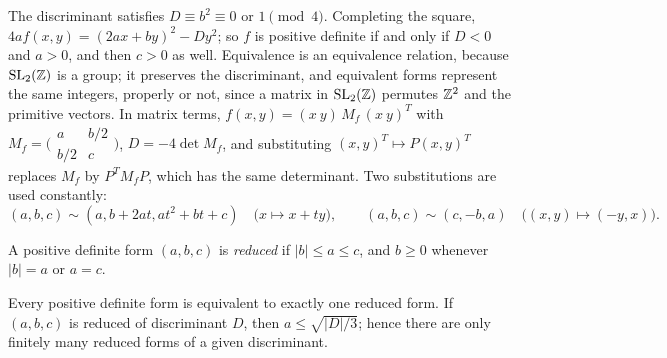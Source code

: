The discriminant satisfies $D \equiv b^2 \equiv 0$ or $1 \pmod 4$. Completing the square, $4af(x, y) = (2ax + by)^2 - Dy^2$; so $f$ is positive definite if and only if $D < 0$ and $a > 0$, and then $c > 0$
as well. Equivalence is an equivalence relation, because $\mathrm{SL}_2(\mathbb{Z})$ is a group; it preserves the discriminant, and equivalent forms represent the same integers, properly or not, since a matrix in
$\mathrm{SL}_2(\mathbb{Z})$ permutes $\mathbb{Z}^2$ and the primitive vectors. In matrix terms, $f(x, y) = (x\ y)\,M_f\,(x\ y)^T$ with $M_f = \bigl(\begin{smallmatrix}a & b/2\\ b/2 & c\end{smallmatrix}\bigr)$, $D = -4\det M_f$, and
substituting $(x, y)^T \mapsto P(x, y)^T$ replaces $M_f$ by $P^TM_fP$, which has the same determinant. Two substitutions are used constantly:
\[
(a, b, c) \sim (a, b + 2at, at^2 + bt + c) \quad \bigl(x \mapsto x + ty\bigr), \qquad (a, b, c) \sim (c, -b, a) \quad \bigl((x, y) \mapsto (-y, x)\bigr).
\]

\begin{definition}\label{number-theory:definition-reduced-form}
A positive definite form $(a, b, c)$ is \emph{reduced} if $|b| \leq a \leq c$, and $b \geq 0$ whenever $|b| = a$ or $a = c$.
\end{definition}

\begin{theorem}\label{number-theory:theorem-reduction}
Every positive definite form is equivalent to exactly one reduced form. If $(a, b, c)$ is reduced of discriminant $D$, then $a \leq \sqrt{|D|/3}$; hence there are only finitely many reduced forms of a
given discriminant.
\end{theorem}

